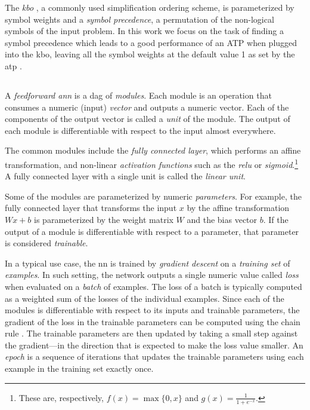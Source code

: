 The \emph{\acrfull{kbo}} \cite{Knuth1983}, a commonly used simplification ordering scheme,
is parameterized by symbol weights and a \emph{symbol precedence},
a permutation of the non-logical symbols of the input problem.
In this work we focus on the task of finding a symbol precedence which
leads to a good performance of an ATP
when plugged into the \gls{kbo},
leaving all the symbol weights at the default 
value 1 as set by the \gls{atp} \Vampire{}.

\subsection{}

A \emph{feedforward \acrlong{ann}} \cite{DBLP:books/daglib/0040158} is a \acrlong{dag} of \emph{modules}.
Each module is an operation that consumes a numeric (input) \emph{vector} and outputs a numeric vector.
Each of the components of the output vector is called a \emph{unit} of the module.
The output of each module is differentiable with respect to the input almost everywhere.

The common modules include
the \emph{fully connected layer}, which performs an affine transformation,
and non-linear \emph{activation functions} such as the \emph{\gls{relu}} or \emph{sigmoid}.\footnote{
These are, respectively, $f(x) = \max\{0,x\}$ and $g(x) = \frac{1}{1+e^{-x}}$.}
A fully connected layer with a single unit is called the \emph{linear unit}.

Some of the modules are parameterized by numeric \emph{parameters}.
For example, the fully connected layer that transforms the input $x$ by the affine transformation $Wx + b$
is parameterized by the weight matrix $W$ and the bias vector $b$.
If the output of a module is differentiable with respect to a parameter,
that parameter is considered \emph{trainable}.

In a typical use case, the \acrlong{nn} is trained by \emph{gradient descent} on a \emph{training set} of \emph{examples}.
In such setting, the network outputs a single numeric value called \emph{loss} when evaluated on a \emph{batch} of examples.
The loss of a batch is typically computed as a weighted sum of the losses of the individual examples.
Since each of the modules is differentiable with respect to its inputs and trainable parameters,
the gradient of the loss in the trainable parameters
can be computed using the chain rule \cite{DBLP:books/daglib/0040158}.
The trainable parameters are then updated by taking a small step
against the gradient---in the direction that is expected to make the loss value smaller.
An \emph{epoch} is a sequence of iterations that updates the trainable parameters
using each example in the training set exactly once.
